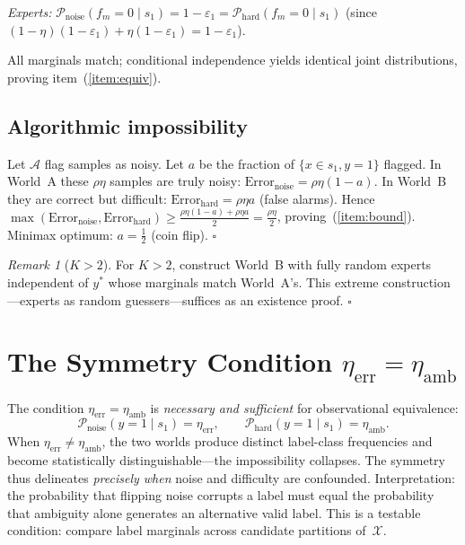 \documentclass[10pt,a4paper]{article}
\theoremstyle{definition}
\theoremstyle{remark}
\newtheorem{remark}[theorem]{Remark}
\begin{document}
\textit{Experts:}
$\mathcal{P}_{\text{noise}}(f_m=0\mid s_1)=1-\varepsilon_1
 =\mathcal{P}_{\text{hard}}(f_m=0\mid s_1)$
(since $(1-\eta)(1-\varepsilon_1)+\eta(1-\varepsilon_1)=1-\varepsilon_1$).

All marginals match; conditional independence yields identical joint distributions,
proving item~(\ref{item:equiv}).

\subsection*{Algorithmic impossibility}

Let $\mathcal{A}$ flag samples as noisy.  Let $a$ be the fraction of $\{x\!\in\!s_1,y=1\}$
flagged.  In World~A these $\rho\eta$ samples are truly noisy:
$\mathrm{Error}_{\text{noise}}=\rho\eta(1-a)$.
In World~B they are correct but difficult: $\mathrm{Error}_{\text{hard}}=\rho\eta a$ (false alarms).
Hence
$\max(\mathrm{Error}_{\text{noise}},\mathrm{Error}_{\text{hard}})
 \ge\frac{\rho\eta(1-a)+\rho\eta a}{2}=\frac{\rho\eta}{2}$,
proving~(\ref{item:bound}).  Minimax optimum: $a=\tfrac12$ (coin flip). \hfill$\square$

\begin{remark}[$K>2$]
For $K>2$, construct World~B with fully random experts independent of $y^*$ whose
marginals match World~A's.  This extreme construction---experts as random guessers---suffices
as an existence proof. \hfill$\square$
\end{remark}

\section{The Symmetry Condition $\eta_{\text{err}}=\eta_{\text{amb}}$}

The condition $\eta_{\text{err}}=\eta_{\text{amb}}$ is \emph{necessary and sufficient}
for observational equivalence:
\[
\mathcal{P}_{\text{noise}}(y=1\mid s_1)=\eta_{\text{err}},\qquad
\mathcal{P}_{\text{hard}}(y=1\mid s_1)=\eta_{\text{amb}}.
\]
When $\eta_{\text{err}}\neq\eta_{\text{amb}}$, the two worlds produce distinct label-class
frequencies and become statistically distinguishable---the impossibility collapses.
The symmetry thus delineates \emph{precisely when} noise and difficulty are confounded.
Interpretation: the probability that flipping noise corrupts a label must equal the
probability that ambiguity alone generates an alternative valid label.  This is a
testable condition: compare label marginals across candidate partitions of~$\mathcal{X}$.
\end{document}
